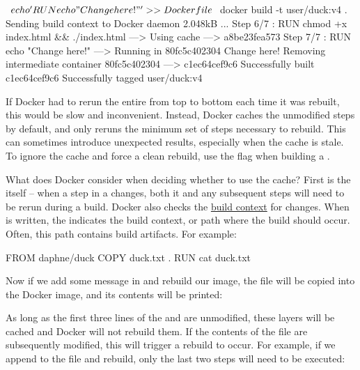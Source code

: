 \begin{pclisting}
~$ echo 'RUN echo "Change here!"' >> Dockerfile
~$ docker build -t user/duck:v4 .
Sending build context to Docker daemon  2.048kB
...
Step 6/7 : RUN chmod +x index.html && ./index.html
---> Using cache
---> a8be23fea573
Step 7/7 : RUN echo "Change here!"
---> Running in 80fc5c402304
Change here!
Removing intermediate container 80fc5c402304
---> c1ec64cef9c6
Successfully built c1ec64cef9c6
Successfully tagged user/duck:v4
\end{pclisting}
%
If Docker had to rerun the entire  from top to bottom each time it was rebuilt, this would be slow and inconvenient. Instead, Docker caches the unmodified steps by default, and only reruns the minimum set of steps necessary to rebuild. This can sometimes introduce unexpected results, especially when the cache is stale. To ignore the cache and force a clean rebuild, use the  flag when building a .

What does Docker consider when deciding whether to use the cache? First is the  itself -- when a step in a  changes, both it and any subsequent steps will need to be rerun during a build. Docker also checks the \href{https://docs.docker.com/engine/reference/commandline/build/#extended-description}{build context} for changes. When  is written, the  indicates the build context, or path where the build should occur. Often, this path contains build artifacts. For example:

\begin{dockerlisting}
FROM daphne/duck
COPY duck.txt .
RUN cat duck.txt
\end{dockerlisting}
%
Now if we add some message in  and rebuild our image, the file will be copied into the Docker image, and its contents will be printed:

%
As long as the first three lines of the  and  are unmodified, these layers will be cached and Docker will not rebuild them. If the contents of the file  are subsequently modified, this will trigger a rebuild to occur. For example, if we append to the file and rebuild, only the last two steps will need to be executed:

